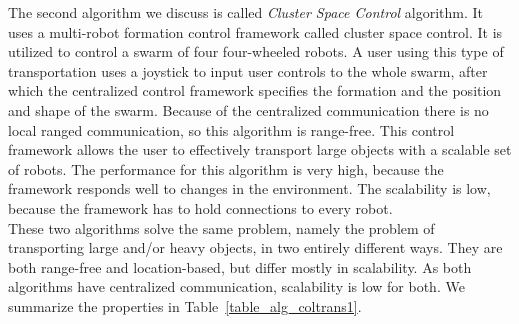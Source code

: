 
The second algorithm we discuss is called \emph{Cluster Space Control} algorithm. \cite{mas2012object}
It uses a multi-robot formation control framework called cluster space control.
It is utilized to control a swarm of four four-wheeled robots.
A user using this type of transportation uses a joystick to input user controls to the whole swarm, after which the centralized control framework specifies the formation and the position and shape of the swarm.
Because of the centralized communication there is no local ranged communication, so this algorithm is range-free. 
This control framework allows the user to effectively transport large objects with a scalable set of robots. 
The performance for this algorithm is very high, because the framework responds well to changes in the environment. 
The scalability is low, because the framework has to hold connections to every robot. \\


These two algorithms solve the same problem, namely the problem of transporting large and/or heavy objects, in two entirely different ways. 
They are both range-free and location-based, but differ mostly in scalability. 
As both algorithms have centralized communication, scalability is low for both.
We summarize the properties in Table~\ref{table_alg_coltrans1}.

  \begin{table}[H]
  \renewcommand{\arraystretch}{1.3}
  \centering
{}
  \caption{User-controlled swarm transportation algorithms}
  \label{table_alg_coltrans1}
  \end{table}

